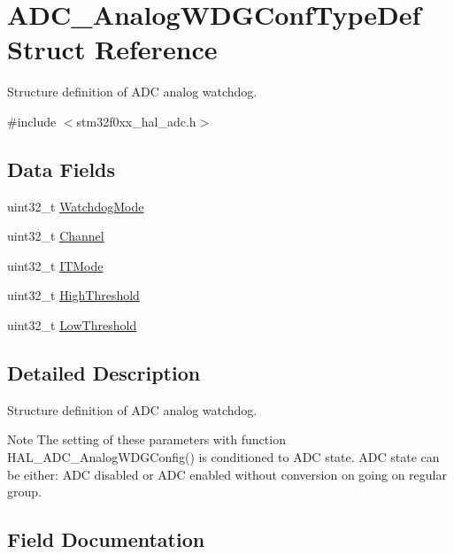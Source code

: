 \hypertarget{struct_a_d_c___analog_w_d_g_conf_type_def}{}\section{A\+D\+C\+\_\+\+Analog\+W\+D\+G\+Conf\+Type\+Def Struct Reference}
\label{struct_a_d_c___analog_w_d_g_conf_type_def}


Structure definition of A\+DC analog watchdog.  




{\ttfamily \#include $<$stm32f0xx\+\_\+hal\+\_\+adc.\+h$>$}

\subsection*{Data Fields}
\begin{DoxyCompactItemize}
\item 
uint32\+\_\+t \hyperlink{struct_a_d_c___analog_w_d_g_conf_type_def_a13924e920be2454c955a2139e2c3eb1a}{Watchdog\+Mode}
\item 
uint32\+\_\+t \hyperlink{struct_a_d_c___analog_w_d_g_conf_type_def_ae82bf9242a014164f9f6907f29782c44}{Channel}
\item 
uint32\+\_\+t \hyperlink{struct_a_d_c___analog_w_d_g_conf_type_def_adb9d0be5088ff9f6e0b5e4bbb9088904}{I\+T\+Mode}
\item 
uint32\+\_\+t \hyperlink{struct_a_d_c___analog_w_d_g_conf_type_def_a5c3a76d9a8ac84c537e7df10b0315e5a}{High\+Threshold}
\item 
uint32\+\_\+t \hyperlink{struct_a_d_c___analog_w_d_g_conf_type_def_a018c772cad96f1f0493ec0019ecc08f9}{Low\+Threshold}
\end{DoxyCompactItemize}


\subsection{Detailed Description}
Structure definition of A\+DC analog watchdog. 

\begin{DoxyNote}{Note}
The setting of these parameters with function H\+A\+L\+\_\+\+A\+D\+C\+\_\+\+Analog\+W\+D\+G\+Config() is conditioned to A\+DC state. A\+DC state can be either\+: A\+DC disabled or A\+DC enabled without conversion on going on regular group. 
\end{DoxyNote}


\subsection{Field Documentation}
\mbox{\label{struct_a_d_c___analog_w_d_g_conf_type_def_ae82bf9242a014164f9f6907f29782c44}} 
